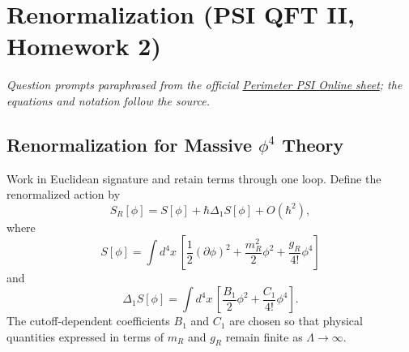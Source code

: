 \section{Renormalization (PSI QFT II, Homework 2)}

\noindent\textit{Question prompts paraphrased from the official
\href{https://psi-online.perimeterinstitute.ca/courses/take/quantum-field-theory-ii-student/pdfs/20776395-module-5-homework}{Perimeter PSI Online sheet};
the equations and notation follow the source.}

\subsection{Renormalization for Massive $\phi^4$ Theory}

Work in Euclidean signature and retain terms through one loop. Define the
renormalized action by
\begin{equation}
    S_R[\phi]
    =S[\phi]+\hbar\Delta_1S[\phi]+O(\hbar^2),
\end{equation}
where
\begin{equation}
    S[\phi]
    =\int d^4x\,
    \left[
        \frac{1}{2}(\partial\phi)^2
        +\frac{m_R^2}{2}\phi^2
        +\frac{g_R}{4!}\phi^4
    \right]
\end{equation}
and
\begin{equation}
    \Delta_1S[\phi]
    =\int d^4x\,
    \left[
        \frac{B_1}{2}\phi^2
        +\frac{C_1}{4!}\phi^4
    \right].
\end{equation}
The cutoff-dependent coefficients $B_1$ and $C_1$ are chosen so that physical
quantities expressed in terms of $m_R$ and $g_R$ remain finite as
$\Lambda\to\infty$.

